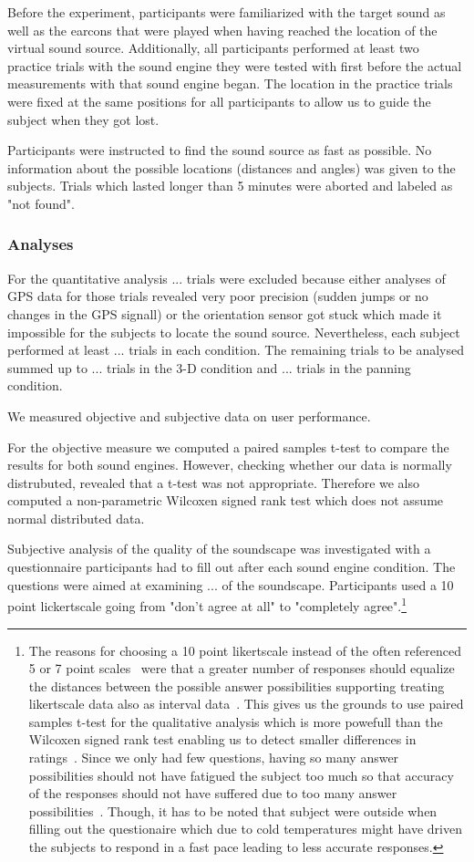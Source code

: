 \documentclass[journal]{IEEEtran}
\begin{document}
Before the experiment, participants were familiarized with the target sound as well as the earcons that were played when having reached the location of the virtual sound source. Additionally, all participants performed at least two practice trials with the sound engine they were tested with first before the actual measurements with that sound engine began. The location in the practice trials were fixed at the same positions for all participants to allow us to guide the subject when they got lost. 

Participants were instructed to find the sound source as fast as possible. No information about the possible locations (distances and angles) was given to the subjects. Trials which lasted longer than 5 minutes were aborted and labeled as "not found". 

\subsubsection{Analyses}
For the quantitative analysis ... trials were excluded because either analyses of GPS data for those trials revealed very poor precision (sudden jumps or no changes in the GPS signall) or the orientation sensor got stuck which made it impossible for the subjects to locate the sound source. Nevertheless, each subject performed at least ... trials in each condition. The remaining trials to be analysed summed up to ... trials in the 3-D condition and ... trials in the panning condition.

We measured objective and subjective data on user performance. 

For the objective measure we computed a paired samples t-test to compare the results for both sound engines. However, checking whether our data is normally distrubuted, revealed that a t-test was not appropriate. Therefore we also computed a non-parametric Wilcoxen signed rank test which does not assume normal distributed data. 

Subjective analysis of the quality of the soundscape was investigated with a questionnaire participants had to fill out after each sound engine condition. The questions were aimed at examining ... of the soundscape. Participants used a 10 point lickertscale going from "don't agree at all" to "completely agree".\footnote{The reasons for choosing a 10 point likertscale instead of the often referenced 5 or 7 point scales~\cite{} were that a greater number of responses should equalize the distances between the possible answer possibilities supporting treating likertscale data also as interval data~\cite{}. This gives us the grounds to use paired samples t-test for the qualitative analysis which is more powefull than the Wilcoxen signed rank test enabling us to detect smaller differences in ratings~\cite{}. Since we only had few questions, having so many answer possibilities should not have fatigued the subject too much so that accuracy of the responses should not have suffered due to too many answer possibilities~\cite{}. Though, it has to be noted that subject were outside when filling out the questionaire which due to cold temperatures might have driven the subjects to respond in a fast pace leading to less accurate responses.} 
\end{document}
